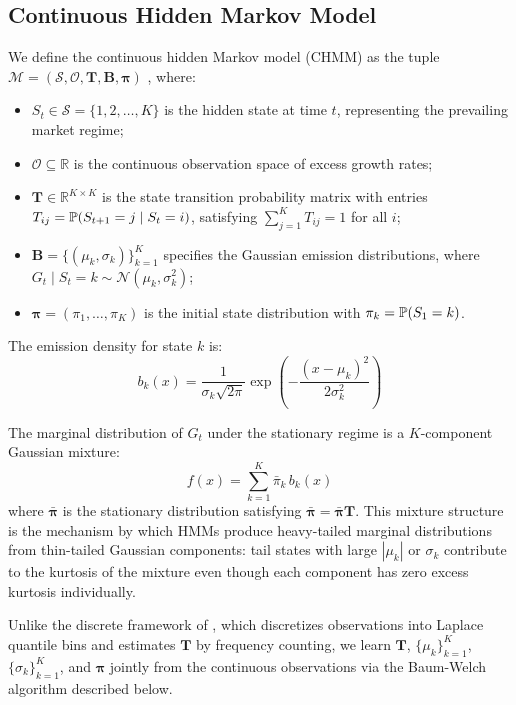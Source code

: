 \subsection{Continuous Hidden Markov Model}
\label{sec:chmm_def}

We define the continuous hidden Markov model (CHMM) as the tuple $\mathcal{M} = (\mathcal{S}, \mathcal{O}, \mathbf{T}, \mathbf{B}, \boldsymbol{\pi})$ \citep{rabiner1986introduction}, where:
\begin{itemize}
    \item $S_t \in \mathcal{S} = \{1, 2, \ldots, K\}$ is the hidden state at time $t$, representing the prevailing market regime;
    \item $\mathcal{O} \subseteq \mathbb{R}$ is the continuous observation space of excess growth rates;
    \item $\mathbf{T} \in \mathbb{R}^{K \times K}$ is the state transition probability matrix with entries $T_{ij} = \mathbb{P}(S_{t+1} = j \mid S_t = i)$, satisfying $\sum_{j=1}^{K} T_{ij} = 1$ for all $i$;
    \item $\mathbf{B} = \{(\mu_k, \sigma_k)\}_{k=1}^{K}$ specifies the Gaussian emission distributions, where $G_t \mid S_t = k \sim \mathcal{N}(\mu_k, \sigma_k^2)$;
    \item $\boldsymbol{\pi} = (\pi_1, \ldots, \pi_K)$ is the initial state distribution with $\pi_k = \mathbb{P}(S_1 = k)$.
\end{itemize}

The emission density for state $k$ is:
\begin{equation}
    b_k(x) = \frac{1}{\sigma_k \sqrt{2\pi}} \exp\!\left(-\frac{(x - \mu_k)^2}{2\sigma_k^2}\right)
    \label{eq:emission}
\end{equation}

The marginal distribution of $G_t$ under the stationary regime is a $K$-component Gaussian mixture:
\begin{equation}
    f(x) = \sum_{k=1}^{K} \bar{\pi}_k \, b_k(x)
    \label{eq:mixture}
\end{equation}
where $\bar{\boldsymbol{\pi}}$ is the stationary distribution satisfying $\bar{\boldsymbol{\pi}} = \bar{\boldsymbol{\pi}} \mathbf{T}$.
This mixture structure is the mechanism by which HMMs produce heavy-tailed marginal distributions from thin-tailed Gaussian components: tail states with large $|\mu_k|$ or $\sigma_k$ contribute to the kurtosis of the mixture even though each component has zero excess kurtosis individually.

Unlike the discrete framework of \citet{alswaidan2026hybrid}, which discretizes observations into Laplace quantile bins and estimates $\mathbf{T}$ by frequency counting, we learn $\mathbf{T}$, $\{\mu_k\}_{k=1}^{K}$, $\{\sigma_k\}_{k=1}^{K}$, and $\boldsymbol{\pi}$ jointly from the continuous observations via the Baum-Welch algorithm described below.


